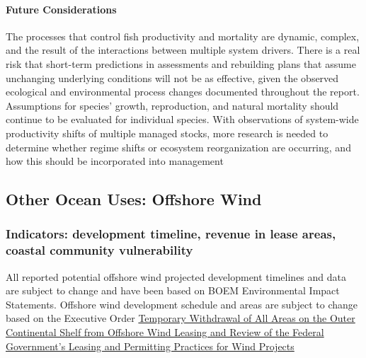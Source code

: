 \documentclass[
  10pt,
]{article}
\begin{document}
\hypertarget{future-considerations-2}{%
\paragraph{Future Considerations}\label{future-considerations-2}}

The processes that control fish productivity and mortality are dynamic, complex, and the result of the interactions between multiple system drivers. There is a real risk that short-term predictions in assessments and rebuilding plans that assume unchanging underlying conditions will not be as effective, given the observed ecological and environmental process changes documented throughout the report. Assumptions for species' growth, reproduction, and natural mortality should continue to be evaluated for individual species. With observations of system-wide productivity shifts of multiple managed stocks, more research is needed to determine whether regime shifts or ecosystem reorganization are occurring, and how this should be incorporated into management

\hypertarget{wind-risks}{%
\subsection{Other Ocean Uses: Offshore Wind}\label{wind-risks}}

\hypertarget{indicators-development-timeline-revenue-in-lease-areas-coastal-community-vulnerability}{%
\subsubsection{Indicators: development timeline, revenue in lease areas, coastal community vulnerability}\label{indicators-development-timeline-revenue-in-lease-areas-coastal-community-vulnerability}}

All reported potential offshore wind projected development timelines and data are subject to change and have been based on BOEM Environmental Impact Statements. Offshore wind development schedule and areas are subject to change based on the Executive Order \href{https://www.whitehouse.gov/presidential-actions/2025/01/temporary-withdrawal-of-all-areas-on-the-outer-continental-shelf-from-offshore-wind-leasing-and-review-of-the-federal-governments-leasing-and-permitting-practices-for-wind-projects/}{Temporary Withdrawal of All Areas on the Outer Continental Shelf from Offshore Wind Leasing and Review of the Federal Government's Leasing and Permitting Practices for Wind Projects}
\end{document}
